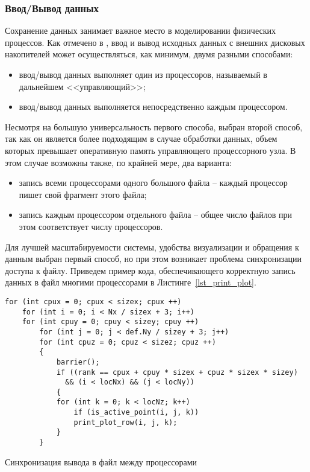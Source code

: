 \subsubsection{Ввод/Вывод данных}
Сохранение данных занимает важное место в моделировании
физических процессов. Как отмечено в \cite{Yakobovsky},
ввод и вывод исходных данных с внешних дисковых накопителей может осуществляться, как минимум,
двумя разными способами:
\begin{itemize}
\item ввод/вывод данных выполняет один из процессоров, называемый в
дальнейшем <<управляющий>>;
\item ввод/вывод данных выполняется непосредственно каждым процессором.
\end{itemize}
Несмотря на большую универсальность первого способа,
выбран второй способ, так как он является более подходящим
в случае обработки данных, объем которых превышает оперативную память управляющего
процессорного узла.
В этом случае возможны также, по крайней мере, два варианта:
\begin{itemize}
\item запись всеми процессорами одного большого файла -- каждый процессор
пишет свой фрагмент этого файла;
\item запись каждым процессором отдельного файла -- общее число файлов
при этом соответствует числу процессоров.
\end{itemize}
Для лучшей масштабируемости системы, удобства визуализации и обращения
к данным выбран первый способ,
но при этом возникает проблема синхронизации доступа к файлу.
Приведем пример кода, обеспечивающего корректную запись данных в файл
многими процессорами в Листинге~\ref{lst_print_plot}.
\begin{listing}[!h]
\begin{verbatim}
for (int cpux = 0; cpux < sizex; cpux ++)
    for (int i = 0; i < Nx / sizex + 3; i++)
	for (int cpuy = 0; cpuy < sizey; cpuy ++)
	    for (int j = 0; j < def.Ny / sizey + 3; j++)
		for (int cpuz = 0; cpuz < sizez; cpuz ++)
		{
		    barrier();
		    if ((rank == cpux + cpuy * sizex + cpuz * sizex * sizey)
			  && (i < locNx) && (j < locNy))
		    {
			for (int k = 0; k < locNz; k++)
			    if (is_active_point(i, j, k))
				print_plot_row(i, j, k);
		    }
		}
\end{verbatim}
\caption{Синхронизация вывода в файл между процессорами}
\label{lst_print_plot}
\end{listing}

